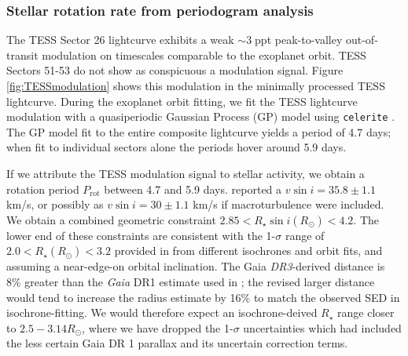 \documentclass[twocolumn]{aastex631}
\begin{document}
\subsubsection{Stellar rotation rate from periodogram analysis}

The TESS Sector 26 lightcurve exhibits a weak $\sim3\;$ppt peak-to-valley out-of-transit modulation on timescales comparable to the exoplanet orbit. TESS Sectors 51-53 do not show as conspicuous a modulation signal.  Figure \ref{fig:TESSmodulation} shows this modulation in the minimally processed TESS lightcurve.  During the exoplanet orbit fitting, we fit the TESS lightcurve modulation with a quasiperiodic Gaussian Process (GP) model using \texttt{celerite} \citep{celerite1,celerite2}.  The GP model fit to the entire composite lightcurve yields a period of 4.7 days; when fit to individual sectors alone the periods hover around 5.9 days.

If we attribute the TESS modulation signal to stellar activity, we obtain a rotation period $P_\mathrm{rot}$ between 4.7 and 5.9 days.  \citet{2017AJ....153..211Z} reported a $v\sin{i}=35.8\pm1.1$ km/s, or possibly as $v\sin{i}=30\pm1.1$ km/s if macroturbulence were included. We obtain a combined geometric constraint $2.85< R_\star \sin{i} (R_\odot) < 4.2 $.  The lower end of these constraints are consistent with  the 1-$\sigma$ range of $2.0 < R_\star (R_\odot) < 3.2$ provided in \citet{2017AJ....153..211Z} from different isochrones and orbit fits, and assuming a near-edge-on orbital inclination.  The Gaia \emph{DR3}-derived distance is 8\% greater than the \emph{Gaia} DR1 estimate used in \citet{2017AJ....153..211Z}; the revised larger distance would tend to increase the radius estimate by 16\% to match the observed SED in isochrone-fitting.  We would therefore expect an isochrone-deived $R_\star$ range closer to $2.5-3.14 R_\odot$, where we have dropped the 1-$\sigma$ uncertainties which had included the less certain Gaia DR 1 parallax and its uncertain correction terms.
\end{document}
